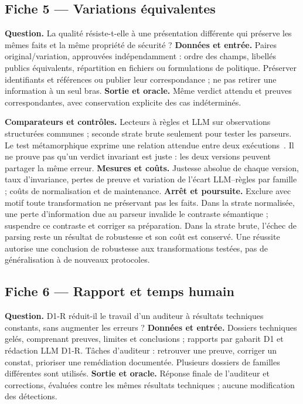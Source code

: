 \documentclass[11pt,a4paper]{article}
\begin{document}
\subsection{Fiche 5 --- Variations équivalentes}
\textbf{Question.} La qualité résiste-t-elle à une présentation différente
qui préserve les mêmes faits et la même propriété de sécurité ?
\textbf{Données et entrée.} Paires original/variation, approuvées indépendamment :
ordre des champs, libellés publics équivalents, répartition en fichiers ou
formulations de politique. Préserver identifiants et références ou publier
leur correspondance ; ne pas retirer une information à un seul bras.
\textbf{Sortie et oracle.} Même verdict attendu et preuves correspondantes,
avec conservation explicite des cas indéterminés.

\textbf{Comparateurs et contrôles.} Lecteurs à règles et LLM sur observations
structurées communes ; seconde strate brute seulement pour tester les parseurs.
Le test métamorphique exprime une relation attendue entre deux exécutions~\cite{barr}.
Il ne prouve pas qu'un verdict invariant est juste : les deux versions peuvent
partager la même erreur.
\textbf{Mesures et coûts.} Justesse absolue de chaque version, taux d'invariance,
pertes de preuve et variation de l'écart LLM--règles par famille ; coûts de
normalisation et de maintenance.
\textbf{Arrêt et poursuite.} Exclure avec motif toute transformation ne préservant
pas les faits. Dans la strate normalisée, une perte d'information due au parseur
invalide le contraste sémantique ; suspendre ce contraste et corriger sa préparation.
Dans la strate brute, l'échec de parsing reste un résultat de robustesse et
son coût est conservé. Une réussite autorise une conclusion de robustesse aux
transformations testées, pas de généralisation à de nouveaux protocoles.

\subsection{Fiche 6 --- Rapport et temps humain}
\textbf{Question.} D1-R réduit-il le travail d'un auditeur à résultats techniques
constants, sans augmenter les erreurs ?
\textbf{Données et entrée.} Dossiers techniques gelés, comprenant preuves,
limites et conclusions ; rapports par gabarit D1 et rédaction LLM D1-R.
Tâches d'auditeur : retrouver une preuve, corriger un constat, prioriser une
remédiation documentée. Plusieurs dossiers de familles différentes sont utilisés.
\textbf{Sortie et oracle.} Réponse finale de l'auditeur et corrections, évaluées
contre les mêmes résultats techniques ; aucune modification des détections.
\end{document}
